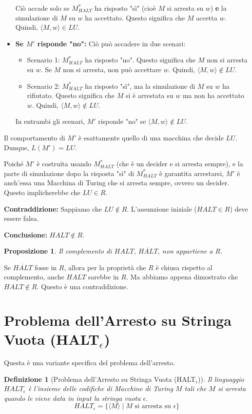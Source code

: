 \documentclass[a4paper]{article}
\makeatletter
\newtheorem{definition}{Definizione}[section] %
\newtheorem{proposition}{Proposizione}[section]
\renewenvironment{proof}[1][\proofname]{\par
  \pushQED{\qed}%
  \normalfont \topsep6\p@\@plus6\p@\relax
  \trivlist
  \item[\hskip\labelsep
        \bfseries
    #1\@addpunct{.}]\ignorespaces
}{%
  \popQED\endtrivlist\@endpefalse
}
\makeatother
\begin{document}
\begin{proof}
\begin{itemize}
    Ciò accade solo se $M_{HALT}^*$ ha risposto "sì" (cioè $M$ si arresta su $w$) \textbf{e} la simulazione di $M$ su $w$ ha accettato.
    Questo significa che $M$ accetta $w$. Quindi, $\langle M, w \rangle \in LU$.
    \item \textbf{Se $M'$ risponde "no":}
    Ciò può accadere in due scenari:
    \begin{itemize}
        \item Scenario 1: $M_{HALT}^*$ ha risposto "no". Questo significa che $M$ non si arresta su $w$. Se $M$ non si arresta, non può accettare $w$. Quindi, $\langle M, w \rangle \notin LU$.
        \item Scenario 2: $M_{HALT}^*$ ha risposto "sì", ma la simulazione di $M$ su $w$ ha rifiutato. Questo significa che $M$ si è arrestata su $w$ ma non ha accettato $w$. Quindi, $\langle M, w \rangle \notin LU$.
    \end{itemize}
    In entrambi gli scenari, $M'$ risponde "no" se $\langle M, w \rangle \notin LU$.
\end{itemize}
Il comportamento di $M'$ è esattamente quello di una macchina che decide $LU$. Dunque, $L(M') = LU$.

Poiché $M'$ è costruita usando $M_{HALT}^*$ (che è un decider e si arresta sempre), e la parte di simulazione dopo la risposta "sì" di $M_{HALT}^*$ è garantita arrestarsi, $M'$ è anch'essa una Macchina di Turing che si arresta sempre, ovvero un decider.
Questo implicherebbe che $LU \in R$.

\textbf{Contraddizione:} Sappiamo che $LU \notin R$.
L'assunzione iniziale ($HALT \in R$) deve essere falsa.

\textbf{Conclusione:} $HALT \notin R$.
\end{proof}

\begin{proposition}
Il complemento di $HALT$, $\overline{HALT}$, non appartiene a $R$.
\end{proposition}
\begin{proof}
Se $\overline{HALT}$ fosse in $R$, allora per la proprietà che $R$ è chiusa rispetto al complemento, anche $HALT$ sarebbe in $R$. Ma abbiamo appena dimostrato che $HALT \notin R$. Questo è una contraddizione.
\end{proof}

\section{Problema dell'Arresto su Stringa Vuota (HALT$_\epsilon$)}
Questa è una variante specifica del problema dell'arresto.
\begin{definition}[Problema dell'Arresto su Stringa Vuota (HALT$_\epsilon$)]
Il linguaggio $HALT_\epsilon$ è l'insieme delle codifiche di Macchine di Turing $M$ tali che $M$ si arresta quando le viene data in input la stringa vuota $\epsilon$.
\[ HALT_\epsilon = \{ \langle M \rangle \mid M \text{ si arresta su } \epsilon \} \]
\end{definition}
\end{document}
